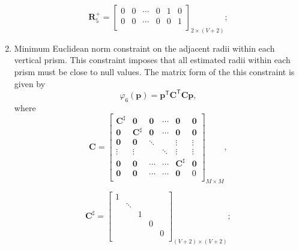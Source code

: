 \documentclass[extra,mreferee]{gji}
\begin{document}
\begin{enumerate}
\begin{equation}
\textbf{R}^{+}_{5} = 
\begin{bmatrix}
0 & 0 & \cdots & 0 & 1 & 0 \\
0 & 0 & \cdots & 0 & 0 & 1 \\
\end{bmatrix}_{2\times (V+2)};
\end{equation}

\item Minimum Euclidean norm constraint on the adjacent radii within each vertical prism. This constraint imposes that all estimated radii within each prism must be close to null values. The matrix form of the this constraint is given by
\begin{equation}
\varphi_{6}(\textbf{p}) = \textbf{p}^\mathsf{T}\textbf{C}^\mathsf{T}\textbf{C}\textbf{p},
\end{equation}
where
\begin{equation}
\textbf{C} = 
\begin{bmatrix}
\textbf{C}^{\sharp} & \mathbf{0} & \mathbf{0} & \cdots & \mathbf{0} & \mathbf{0}\\
\mathbf{0} & \textbf{C}^{\sharp} &  \mathbf{0} & \cdots & \mathbf{0} & \mathbf{0}\\
\mathbf{0} & \mathbf{0} & \ddots & & \vdots & \vdots\\
\vdots & \vdots & & \ddots & \vdots & \vdots\\
\mathbf{0} & \mathbf{0} &  \cdots & \cdots & \textbf{C}^{\sharp} & \mathbf{0}\\
\mathbf{0} & \mathbf{0} &  \cdots &  \cdots & \mathbf{0} & 0\\
\end{bmatrix}_{M\times M} ,
\end{equation}

\begin{equation}
\textbf{C}^{\sharp} = 
\begin{bmatrix}
1 & & & & \\
& \ddots &  & &  \\
&  & 1 & & \\
&  & & 0 &  \\
&  & & & 0 \\
\end{bmatrix}_{(V+2)\times (V+2)};
\end{equation}


\end{enumerate}
\end{document}
